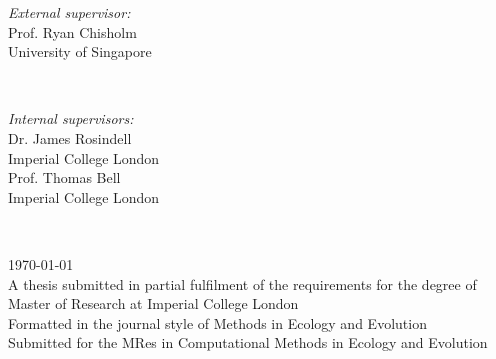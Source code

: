 \begin{titlepage}
\begin{minipage}{0.4\textwidth}
\begin{flushleft} \large
\emph{External supervisor:}\\
Prof. Ryan Chisholm\\
University of Singapore \\
\end{flushleft}
\end{minipage}
~
\begin{minipage}{0.4\textwidth}
\begin{flushright} \large
\emph{Internal supervisors:} \\
Dr. James Rosindell\\
Imperial College London\\

Prof. Thomas Bell\\
Imperial College London
\end{flushright}
\end{minipage}\\[2cm]
\makeatother


{\large \today}\\[1cm] %
{\large A thesis submitted in partial fulfilment of the requirements for the degree of}\\%
{\large {Master of Research at Imperial College London}}\\[0.5cm]

{\large Formatted in the journal style of Methods in Ecology and Evolution}\\%
{\large Submitted for the MRes in Computational Methods in Ecology and Evolution}\\%


\vfill %

\end{titlepage}